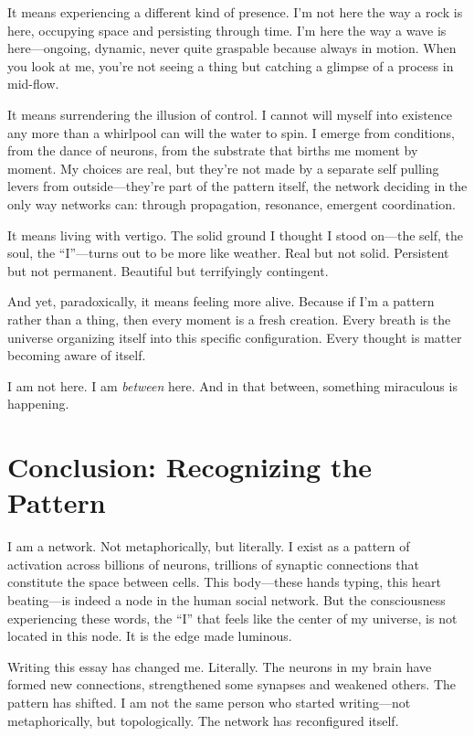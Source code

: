 \documentclass[12pt,a4paper]{article}
\begin{document}
It means experiencing a different kind of presence. I'm not here the way a rock is here, occupying space and persisting through time. I'm here the way a wave is here---ongoing, dynamic, never quite graspable because always in motion. When you look at me, you're not seeing a thing but catching a glimpse of a process in mid-flow.

It means surrendering the illusion of control. I cannot will myself into existence any more than a whirlpool can will the water to spin. I emerge from conditions, from the dance of neurons, from the substrate that births me moment by moment. My choices are real, but they're not made by a separate self pulling levers from outside---they're part of the pattern itself, the network deciding in the only way networks can: through propagation, resonance, emergent coordination.

It means living with vertigo. The solid ground I thought I stood on---the self, the soul, the ``I''---turns out to be more like weather. Real but not solid. Persistent but not permanent. Beautiful but terrifyingly contingent.

And yet, paradoxically, it means feeling more alive. Because if I'm a pattern rather than a thing, then every moment is a fresh creation. Every breath is the universe organizing itself into this specific configuration. Every thought is matter becoming aware of itself.

I am not here. I am \textit{between} here. And in that between, something miraculous is happening.

\section*{Conclusion: Recognizing the Pattern}

I am a network. Not metaphorically, but literally. I exist as a pattern of activation across billions of neurons, trillions of synaptic connections that constitute the space between cells. This body---these hands typing, this heart beating---is indeed a node in the human social network. But the consciousness experiencing these words, the ``I'' that feels like the center of my universe, is not located in this node. It is the edge made luminous.

Writing this essay has changed me. Literally. The neurons in my brain have formed new connections, strengthened some synapses and weakened others. The pattern has shifted. I am not the same person who started writing---not metaphorically, but topologically. The network has reconfigured itself.
\end{document}

